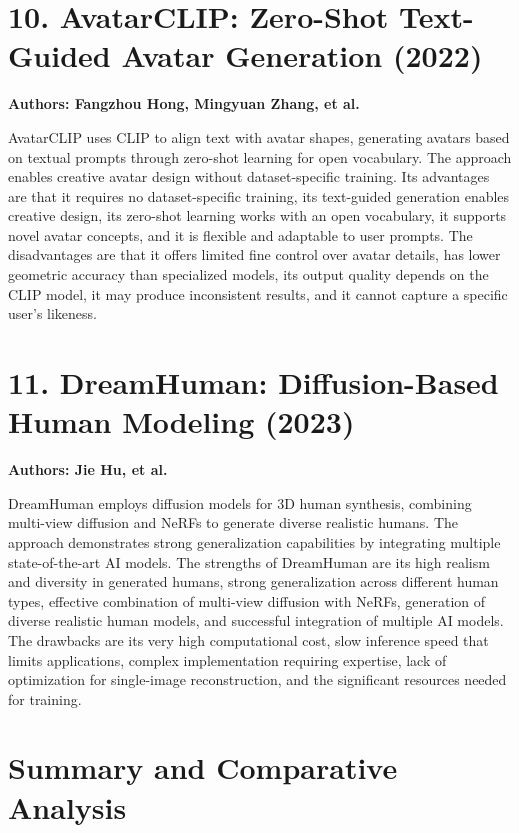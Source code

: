 \documentclass[12pt,a4paper,oneside]{report}
\begin{document}
\section*{10. AvatarCLIP: Zero-Shot Text-Guided Avatar Generation (2022)}

\textbf{Authors: Fangzhou Hong, Mingyuan Zhang, et al.}

AvatarCLIP uses CLIP to align text with avatar shapes, generating avatars based on textual prompts through zero-shot learning for open vocabulary. The approach enables creative avatar design without dataset-specific training. Its advantages are that it requires no dataset-specific training, its text-guided generation enables creative design, its zero-shot learning works with an open vocabulary, it supports novel avatar concepts, and it is flexible and adaptable to user prompts. The disadvantages are that it offers limited fine control over avatar details, has lower geometric accuracy than specialized models, its output quality depends on the CLIP model, it may produce inconsistent results, and it cannot capture a specific user's likeness.

\section*{11. DreamHuman: Diffusion-Based Human Modeling (2023)}

\textbf{Authors: Jie Hu, et al.}

DreamHuman employs diffusion models for 3D human synthesis, combining multi-view diffusion and NeRFs to generate diverse realistic humans. The approach demonstrates strong generalization capabilities by integrating multiple state-of-the-art AI models. The strengths of DreamHuman are its high realism and diversity in generated humans, strong generalization across different human types, effective combination of multi-view diffusion with NeRFs, generation of diverse realistic human models, and successful integration of multiple AI models. The drawbacks are its very high computational cost, slow inference speed that limits applications, complex implementation requiring expertise, lack of optimization for single-image reconstruction, and the significant resources needed for training.






\section{Summary and Comparative Analysis}
\end{document}
